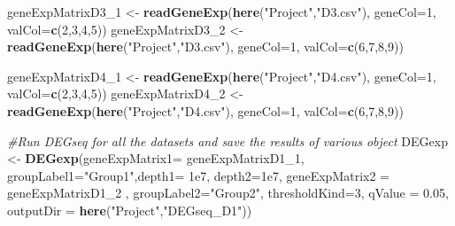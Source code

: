 \documentclass[]{article}
\newenvironment{Shaded}{\begin{snugshade}}{\end{snugshade}}
\newcommand{\CommentTok}[1]{\textcolor[rgb]{0.56,0.35,0.01}{\textit{#1}}}
\newcommand{\DataTypeTok}[1]{\textcolor[rgb]{0.13,0.29,0.53}{#1}}
\newcommand{\DecValTok}[1]{\textcolor[rgb]{0.00,0.00,0.81}{#1}}
\newcommand{\FloatTok}[1]{\textcolor[rgb]{0.00,0.00,0.81}{#1}}
\newcommand{\KeywordTok}[1]{\textcolor[rgb]{0.13,0.29,0.53}{\textbf{#1}}}
\newcommand{\NormalTok}[1]{#1}
\newcommand{\StringTok}[1]{\textcolor[rgb]{0.31,0.60,0.02}{#1}}
\begin{document}
\begin{Shaded}
\begin{Highlighting}[]
\NormalTok{geneExpMatrixD3_}\DecValTok{1}\NormalTok{ <-}\StringTok{ }\KeywordTok{readGeneExp}\NormalTok{(}\KeywordTok{here}\NormalTok{(}\StringTok{"Project"}\NormalTok{,}\StringTok{"D3.csv"}\NormalTok{), }\DataTypeTok{geneCol=}\DecValTok{1}\NormalTok{, }\DataTypeTok{valCol=}\KeywordTok{c}\NormalTok{(}\DecValTok{2}\NormalTok{,}\DecValTok{3}\NormalTok{,}\DecValTok{4}\NormalTok{,}\DecValTok{5}\NormalTok{))}
\NormalTok{geneExpMatrixD3_}\DecValTok{2}\NormalTok{ <-}\StringTok{ }\KeywordTok{readGeneExp}\NormalTok{(}\KeywordTok{here}\NormalTok{(}\StringTok{"Project"}\NormalTok{,}\StringTok{"D3.csv"}\NormalTok{), }\DataTypeTok{geneCol=}\DecValTok{1}\NormalTok{, }\DataTypeTok{valCol=}\KeywordTok{c}\NormalTok{(}\DecValTok{6}\NormalTok{,}\DecValTok{7}\NormalTok{,}\DecValTok{8}\NormalTok{,}\DecValTok{9}\NormalTok{))}

\NormalTok{geneExpMatrixD4_}\DecValTok{1}\NormalTok{ <-}\StringTok{ }\KeywordTok{readGeneExp}\NormalTok{(}\KeywordTok{here}\NormalTok{(}\StringTok{"Project"}\NormalTok{,}\StringTok{"D4.csv"}\NormalTok{), }\DataTypeTok{geneCol=}\DecValTok{1}\NormalTok{, }\DataTypeTok{valCol=}\KeywordTok{c}\NormalTok{(}\DecValTok{2}\NormalTok{,}\DecValTok{3}\NormalTok{,}\DecValTok{4}\NormalTok{,}\DecValTok{5}\NormalTok{))}
\NormalTok{geneExpMatrixD4_}\DecValTok{2}\NormalTok{ <-}\StringTok{ }\KeywordTok{readGeneExp}\NormalTok{(}\KeywordTok{here}\NormalTok{(}\StringTok{"Project"}\NormalTok{,}\StringTok{"D4.csv"}\NormalTok{), }\DataTypeTok{geneCol=}\DecValTok{1}\NormalTok{, }\DataTypeTok{valCol=}\KeywordTok{c}\NormalTok{(}\DecValTok{6}\NormalTok{,}\DecValTok{7}\NormalTok{,}\DecValTok{8}\NormalTok{,}\DecValTok{9}\NormalTok{))}


\CommentTok{#Run DEGseq for all the datasets and save the results of various object}
\NormalTok{DEGexp <-}\StringTok{ }\KeywordTok{DEGexp}\NormalTok{(}\DataTypeTok{geneExpMatrix1=}\NormalTok{ geneExpMatrixD1_}\DecValTok{1}\NormalTok{, }\DataTypeTok{groupLabel1=}\StringTok{"Group1"}\NormalTok{,}\DataTypeTok{depth1=} \FloatTok{1e7}\NormalTok{, }\DataTypeTok{depth2=}\FloatTok{1e7}\NormalTok{, }\DataTypeTok{geneExpMatrix2 =}\NormalTok{ geneExpMatrixD1_}\DecValTok{2}\NormalTok{ , }\DataTypeTok{groupLabel2=}\StringTok{"Group2"}\NormalTok{, }\DataTypeTok{thresholdKind=}\DecValTok{3}\NormalTok{, }\DataTypeTok{qValue =} \FloatTok{0.05}\NormalTok{, }\DataTypeTok{outputDir =} \KeywordTok{here}\NormalTok{(}\StringTok{"Project"}\NormalTok{,}\StringTok{"DEGseq_D1"}\NormalTok{))}
\end{Highlighting}
\end{Shaded}
\end{document}
